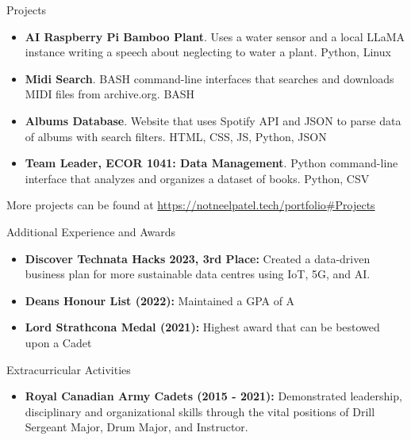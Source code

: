 \documentclass[]{mcdowellcv}
\begin{document}
	\begin{cvsection}{Projects}
		\begin{cvsubsection}{}{}{}
			\begin{itemize}
				\item \textbf{AI Raspberry Pi Bamboo Plant}. Uses a water sensor and a local LLaMA instance writing a speech about neglecting to water a plant. Python, Linux
				\item \textbf{Midi Search}. BASH command-line interfaces that searches and downloads MIDI files from archive.org. BASH
				\item \textbf{Albums Database}. Website that uses Spotify API and JSON to parse data of albums with search filters. HTML, CSS, JS, Python, JSON
				\item \textbf{Team Leader, ECOR 1041: Data Management}. Python command-line interface that analyzes and organizes a dataset of books. Python, CSV
			\end{itemize}
				More projects can be found at \url{https://notneelpatel.tech/portfolio#Projects}
		\end{cvsubsection}
	\end{cvsection}
	
	\begin{cvsection}{Additional Experience and Awards}
		\begin{cvsubsection}{}{}{}	
			\begin{itemize}
				\item \textbf{Discover Technata Hacks 2023, 3rd Place:} Created a data-driven business plan for more sustainable data centres using IoT, 5G, and AI.  
				\item \textbf{Deans Honour List (2022):} Maintained a GPA of A
				\item \textbf{Lord Strathcona Medal (2021):} Highest award that can be bestowed upon a Cadet
			\end{itemize}
		\end{cvsubsection}
	\end{cvsection}
	
	\begin{cvsection}{Extracurricular Activities}
		\begin{cvsubsection}{}{}{}
			\begin{itemize}
				\item \textbf{Royal Canadian Army Cadets (2015 - 2021):} Demonstrated leadership, disciplinary and organizational skills through the vital positions of Drill Sergeant Major, Drum Major, and Instructor.
			\end{itemize}
		\end{cvsubsection}
	\end{cvsection}
\end{document}
